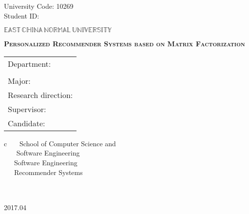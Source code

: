 \newpage

\pagestyle{empty}

\hskip 1.83cm {\large University Code: 10269}\\
\hspace*{\fill} {\large Student ID: ~~~~~}

\vskip 2cm

\begin{center}
{\Huge $\mathbb{EAST}\,\mathbb{CHINA}\,\mathbb{NORMAL}\,
\mathbb{UNIVERSITY}$}
\end{center}

\vskip 3cm

\begin{center}
\bfseries{\scshape{\huge Personalized Recommender Systems based on  Matrix Factorization}}\\
\end{center}

\vskip 2cm {\large
\begin{center}
\begin{tabular}{l}
Department:\\
\\
Major:\\
Research direction:\\

Supervisor:\\
Candidate:
\end{tabular}
\begin{tabular}c
~~~School of Computer Science and\\
\hline~~~ Software Engineering    \\
\hline ~~~Software Engineering    \\
\hline ~~~Recommender Systems\\ 
\hline ~~~\\
\hline ~~~  \\
\hline
\end{tabular}
\end{center}}

\vskip 30mm

\begin{center}
{\Large 2017.04}
\end{center}
\clearpage
\phantom{s}
\clearpage
